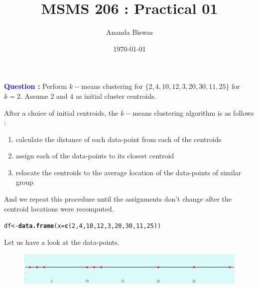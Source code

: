 \documentclass[11pt, a4paper]{article}\usepackage[]{graphicx}\usepackage[]{xcolor}
\title{MSMS 206 : Practical 01}
\author{Ananda Biswas}
\date{\today}
\makeatletter
\newcommand{\hlnum}[1]{\textcolor[rgb]{0.686,0.059,0.569}{#1}}%
\newcommand{\hldef}[1]{\textcolor[rgb]{0.345,0.345,0.345}{#1}}%
\newcommand{\hlkwb}[1]{\textcolor[rgb]{0.69,0.353,0.396}{#1}}%
\newcommand{\hlkwc}[1]{\textcolor[rgb]{0.333,0.667,0.333}{#1}}%
\newcommand{\hlkwd}[1]{\textcolor[rgb]{0.737,0.353,0.396}{\textbf{#1}}}%
\newenvironment{kframe}{%
 \def\at@end@of@kframe{}%
 \ifinner\ifhmode%
  \def\at@end@of@kframe{\end{minipage}}%
  \begin{minipage}{\columnwidth}%
 \fi\fi%
 \def\FrameCommand##1{\hskip\@totalleftmargin \hskip-\fboxsep
 \colorbox{shadecolor}{##1}\hskip-\fboxsep
     \hskip-\linewidth \hskip-\@totalleftmargin \hskip\columnwidth}%
 \MakeFramed {\advance\hsize-\width
   \@totalleftmargin\z@ \linewidth\hsize
   \@setminipage}}%
 {\par\unskip\endMakeFramed%
 \at@end@of@kframe}
\newenvironment{knitrout}{}{} %
\makeatother
\begin{document}
\maketitle


 \hspace{0.2cm} \textcolor{blue}{\textbf{Question :}} Perform $k-$means clustering for $\{2, 4, 10, 12, 3, 20, 30, 11, 25\}$ for $k = 2$. Assume $2$ and $4$ as initial cluster centroids.

\vspace{1cm}

\faArrowAltCircleRight[regular] \hspace{0.2cm} After a choice of initial centroids, the $k-$means clustering algorithm is as follows :

\begin{enumerate}[(1)]
\item calculate the distance of each data-point from each of the centroids
\item assign each of the data-points to its closest centroid
\item relocate the centroids to the average location of the data-points of similar group
\end{enumerate}

And we repeat this procedure until the assignments don't change after the centroid locations were recomputed.

\begin{knitrout}
\color{fgcolor}\begin{kframe}
\begin{alltt}
\hldef{df} \hlkwb{<-} \hlkwd{data.frame}\hldef{(}\hlkwc{x} \hldef{=} \hlkwd{c}\hldef{(}\hlnum{2}\hldef{,} \hlnum{4}\hldef{,} \hlnum{10}\hldef{,} \hlnum{12}\hldef{,} \hlnum{3}\hldef{,} \hlnum{20}\hldef{,} \hlnum{30}\hldef{,} \hlnum{11}\hldef{,} \hlnum{25}\hldef{))}
\end{alltt}
\end{kframe}
\end{knitrout}







Let us have a look at the data-points.

\begin{figure}[!htbp]
\centering
\includegraphics[scale = 0.4]{initial.png}
\end{figure}
\end{document}
